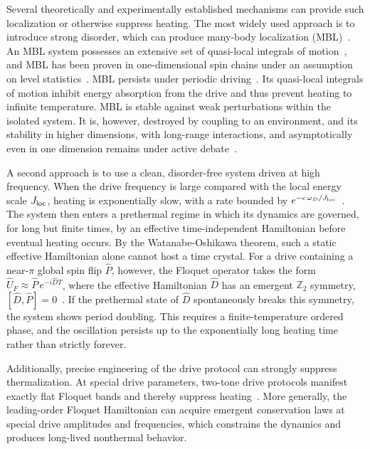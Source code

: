 \documentclass[%
reprint,
superscriptaddress,
amsmath,amssymb,
aps,
prb,
showkeys,%
floatfix,
]{revtex4-2}
\let\cite\citep   %
\begin{document}
	Several theoretically and experimentally established mechanisms can provide such localization or otherwise suppress heating. The most widely used approach is to introduce strong disorder, which can produce many-body localization (MBL)~\cite{Basko2006,PalHuse2010,AbaninRMP2019}. An MBL system possesses an extensive set of quasi-local integrals of motion~\cite{SerbynPapicAbanin2013,HuseNandkishoreOganesyan2014}, and MBL has been proven in one-dimensional spin chains under an assumption on level statistics~\cite{Imbrie2016}. MBL persists under periodic driving~\cite{Ponte2015,LazaridesDasMoessner2015}. Its quasi-local integrals of motion inhibit energy absorption from the drive and thus prevent heating to infinite temperature. MBL is stable against weak perturbations within the isolated system. It is, however, destroyed by coupling to an environment, and its stability in higher dimensions, with long-range interactions, and asymptotically even in one dimension remains under active debate~\cite{DeRoeckHuveneers2017,Suntajs2020,Morningstar2022}.
	
	A second approach is to use a clean, disorder-free system driven at high frequency. When the drive frequency is large compared with the local energy scale $J_{\rm loc}$, heating is exponentially slow, with a rate bounded by $e^{-c\,\omega_D/J_{\rm loc}}$~\cite{AbaninCMP2017,Mori2016,KuwaharaMoriSaito2016}. The system then enters a prethermal regime in which its dynamics are governed, for long but finite times, by an effective time-independent Hamiltonian before eventual heating occurs. By the Watanabe-Oshikawa theorem, such a static effective Hamiltonian alone cannot host a time crystal. For a drive containing a near-$\pi$ global spin flip $\hat{P}$, however, the Floquet operator takes the form $\hat{U}_F\approx\hat{P}\,e^{-i\hat{D}T}$, where the effective Hamiltonian $\hat{D}$ has an emergent $\mathbb{Z}_2$ symmetry, $[\hat{D},\hat{P}]=0$~\cite{ElseBauerNayakPRX2017}. If the prethermal state of $\hat{D}$ spontaneously breaks this symmetry, the system shows period doubling. This requires a finite-temperature ordered phase, and the oscillation persists up to the exponentially long heating time rather than strictly forever.
	
	Additionally, precise engineering of the drive protocol can strongly suppress thermalization. At special drive parameters, two-tone drive protocols manifest exactly flat Floquet bands and thereby suppress heating~\cite{Banerjee_2025}. More generally, the leading-order Floquet Hamiltonian can acquire emergent conservation laws at special drive amplitudes and frequencies, which constrains the dynamics and produces long-lived nonthermal behavior.
	
\end{document}
